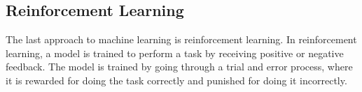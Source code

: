 \subsection{Reinforcement Learning}\label{sec:reinforcement-learning}
The last approach to machine learning is reinforcement learning. In reinforcement learning, a model is trained to perform a task by
receiving positive or negative feedback. The model is trained by going through a trial and error process, where it is rewarded for doing
the task correctly and punished for doing it incorrectly. \cite{ml_reinforcement_learning} 